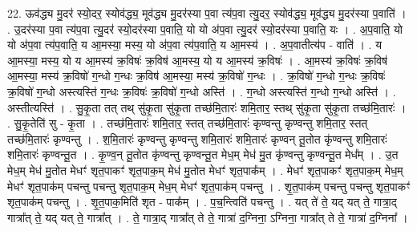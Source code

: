 \documentclass[17pt]{extarticle}
\begin{document}
22. ऊव॑द्ध्य मु॒दर॑ स्यो॒दर॒ स्योव॑द्ध्य॒ मूव॑द्ध्य मु॒दर॑स्या प॒वा त्य॑प॒वा त्यु॒दर॒ स्योव॑द्ध्य॒ मूव॑द्ध्य मु॒दर॑स्या प॒वाति॑ । . उ॒दर॑स्या प॒वा त्य॑प॒वा त्यु॒दर॑ स्यो॒दर॑स्या प॒वाति॒ यो यो अ॑प॒वा त्यु॒दर॑ स्यो॒दर॑स्या प॒वाति॒ यः । . अ॒प॒वाति॒ यो यो अ॑प॒वा त्य॑प॒वाति॒ य आ॒मस्या॒ मस्य॒ यो अ॑प॒वा त्य॑प॒वाति॒ य आ॒मस्य॑ । . अ॒प॒वातीत्य॑प - वाति॑ । . य आ॒मस्या॒ मस्य॒ यो य आ॒मस्य॑ क्र॒विषः॑ क्र॒विष॑ आ॒मस्य॒ यो य आ॒मस्य॑ क्र॒विषः॑ । . आ॒मस्य॑ क्र॒विषः॑ क्र॒विष॑ आ॒मस्या॒ मस्य॑ क्र॒विषो॑ ग॒न्धो ग॒न्धः क्र॒विष॑ आ॒मस्या॒ मस्य॑ क्र॒विषो॑ ग॒न्धः । . क्र॒विषो॑ ग॒न्धो ग॒न्धः क्र॒विषः॑ क्र॒विषो॑ ग॒न्धो अस्त्यस्ति॑ ग॒न्धः क्र॒विषः॑ क्र॒विषो॑ ग॒न्धो अस्ति॑ । . ग॒न्धो अस्त्यस्ति॑ ग॒न्धो ग॒न्धो अस्ति॑ । . अस्तीत्यस्ति॑ । . सु॒कृ॒ता तत् तथ् सु॑कृ॒ता सु॑कृ॒ता तच्छ॑मि॒तारः॑ शमि॒तार॒ स्तथ् सु॑कृ॒ता सु॑कृ॒ता तच्छ॑मि॒तारः॑ । . सु॒कृ॒तेति॑ सु - कृ॒ता । . तच्छ॑मि॒तारः॑ शमि॒तार॒ स्तत् तच्छ॑मि॒तारः॑ कृण्वन्तु कृण्वन्तु शमि॒तार॒ स्तत् तच्छ॑मि॒तारः॑ कृण्वन्तु । . श॒मि॒तारः॑ कृण्वन्तु कृण्वन्तु शमि॒तारः॑ शमि॒तारः॑ कृण्वन् तू॒तोत कृ॑ण्वन्तु शमि॒तारः॑ शमि॒तारः॑ कृण्वन्तू॒त । . कृ॒ण्व॒न् तू॒तोत कृ॑ण्वन्तु कृण्वन्तू॒त मेध॒म् मेध॑ मु॒त कृ॑ण्वन्तु कृण्वन्तू॒त मेध᳚म् । . उ॒त मेध॒म् मेध॑ मु॒तोत मेधꣳ॑ शृत॒पाकꣳ॑ शृत॒पाक॒म् मेध॑ मु॒तोत मेधꣳ॑ शृत॒पाक᳚म् । . मेधꣳ॑ शृत॒पाकꣳ॑ शृत॒पाक॒म् मेध॒म् मेधꣳ॑ शृत॒पाक॑म् पचन्तु पचन्तु शृत॒पाक॒म् मेध॒म् मेधꣳ॑ शृत॒पाक॑म् पचन्तु । . शृ॒त॒पाक॑म् पचन्तु पचन्तु शृत॒पाकꣳ॑ शृत॒पाक॑म् पचन्तु । . शृ॒त॒पाक॒मिति॑ शृत - पाक᳚म् । . प॒च॒न्त्विति॑ पचन्तु । . यत् ते॑ ते॒ यद् यत् ते॒ गात्रा॒द् गात्रा᳚त् ते॒ यद् यत् ते॒ गात्रा᳚त् । . ते॒ गात्रा॒द् गात्रा᳚त् ते ते॒ गात्रा॑ द॒ग्निना॒ ऽग्निना॒ गात्रा᳚त् ते ते॒ गात्रा॑ द॒ग्निना᳚ । \newline
\end{document}
